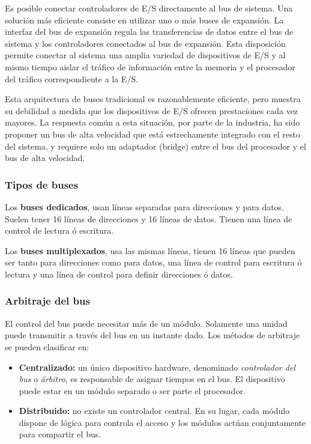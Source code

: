 Es posible conectar controladores de E/S directamente al bus de sistema. Una solución más eficiente consiste en utilizar uno o más buses de expansión. La interfaz del bus de expansión regula las transferencias de datos entre el bus de sistema y los controladores conectados al bus de expansión. Esta disposición permite conectar al sistema una amplia variedad de dispositivos de E/S y al mismo tiempo aislar el tráfico de información entre la memoria y el procesador del tráfico correspondiente a la E/S.

Esta arquitectura de buses tradicional es razonablemente eficiente, pero muestra su debilidad a medida que los dispositivos de E/S ofrecen prestaciones cada vez mayores. La respuesta común a esta situación, por parte de la industria, ha sido proponer un bus de alta velocidad que está estrechamente integrado con el resto del sistema, y requiere solo un adaptador (bridge) entre el bus del procesador y el bus de alta velocidad.

\subsubsection*{Tipos de buses}

Los \textbf{buses dedicados}, usan líneas separadas para direcciones y para datos. Suelen tener 16 líneas de direcciones y 16 líneas de datos. Tienen una línea de control de lectura ó escritura.

Los \textbf{buses multiplexados}, usa las mismas líneas, tienen 16 líneas que pueden ser tanto para direcciones como para datos, una línea de control para escritura ó lectura y una línea de control para definir direcciones ó datos.

\subsubsection*{Arbitraje del bus}

El control del bus puede necesitar más de un módulo. Solamente una unidad puede transmitir a través del bus en un instante dado. Los métodos de arbitraje se pueden clasificar en:

\begin{itemize}
  \item \textbf{Centralizado:} un único dispositivo hardware, denominado \textit{controlador del bus} o \textit{árbitro}, es responsable de asignar tiempos en el bus. El dispositivo puede estar en un módulo separado o ser parte el procesador.
  \item \textbf{Distribuido:} no existe un controlador central. En su lugar, cada módulo dispone de lógica para controla el acceso y los módulos actúan conjuntamente para compartir el bus. 
\end{itemize}

